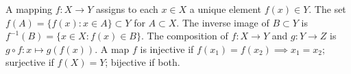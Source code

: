 A mapping $f: X \to Y$ assigns to each $x \in X$ a unique element $f(x) \in Y$. The set $f(A) = \{f(x) : x \in A\} \subset Y$ for $A \subset X$. The inverse image of $B \subset Y$ is $f^{-1}(B) = \{x \in X : f(x) \in B\}$. The composition of $f: X \to Y$ and $g: Y \to Z$ is $g \circ f: x \mapsto g(f(x))$. A map $f$ is injective if $f(x_1) = f(x_2) \implies x_1 = x_2$; surjective if $f(X) = Y$; bijective if both.
